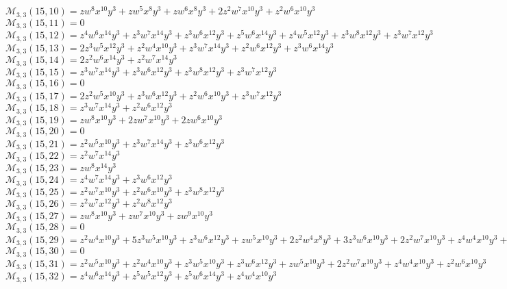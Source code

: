 \documentclass[12pt]{memoireuqam1.3}
\begin{document}
$\mathcal{M}_{3,3}(15,10)=zw^8x^{10}y^3+zw^5x^8y^3+zw^6x^8y^3+2z^2w^7x^{10}y^3+z^2w^6x^{10}y^3$\\
$\mathcal{M}_{3,3}(15,11)=0$\\
$\mathcal{M}_{3,3}(15,12)=z^4w^6x^{14}y^3+z^3w^7x^{14}y^3+z^3w^6x^{12}y^3+z^5w^6x^{14}y^3+z^4w^5x^{12}y^3+z^3w^8x^{12}y^3+z^3w^7x^{12}y^3$\\
$\mathcal{M}_{3,3}(15,13)=2z^3w^5x^{12}y^3+z^2w^4x^{10}y^3+z^3w^7x^{14}y^3+z^2w^6x^{12}y^3+z^3w^6x^{14}y^3$\\
$\mathcal{M}_{3,3}(15,14)=2z^2w^6x^{14}y^3+z^2w^7x^{14}y^3$\\
$\mathcal{M}_{3,3}(15,15)=z^3w^7x^{14}y^3+z^3w^6x^{12}y^3+z^3w^8x^{12}y^3+z^3w^7x^{12}y^3$\\
$\mathcal{M}_{3,3}(15,16)=0$\\
$\mathcal{M}_{3,3}(15,17)=2z^2w^5x^{10}y^3+z^3w^6x^{12}y^3+z^2w^6x^{10}y^3+z^3w^7x^{12}y^3$\\
$\mathcal{M}_{3,3}(15,18)=z^3w^7x^{14}y^3+z^2w^6x^{12}y^3$\\
$\mathcal{M}_{3,3}(15,19)=zw^8x^{10}y^3+2zw^7x^{10}y^3+2zw^6x^{10}y^3$\\
$\mathcal{M}_{3,3}(15,20)=0$\\
$\mathcal{M}_{3,3}(15,21)=z^2w^5x^{10}y^3+z^3w^7x^{14}y^3+z^3w^6x^{12}y^3$\\
$\mathcal{M}_{3,3}(15,22)=z^2w^7x^{14}y^3$\\
$\mathcal{M}_{3,3}(15,23)=zw^8x^{14}y^3$\\
$\mathcal{M}_{3,3}(15,24)=z^4w^7x^{14}y^3+z^3w^6x^{12}y^3$\\
$\mathcal{M}_{3,3}(15,25)=z^2w^7x^{10}y^3+z^2w^6x^{10}y^3+z^3w^8x^{12}y^3$\\
$\mathcal{M}_{3,3}(15,26)=z^2w^7x^{12}y^3+z^2w^8x^{12}y^3$\\
$\mathcal{M}_{3,3}(15,27)=zw^8x^{10}y^3+zw^7x^{10}y^3+zw^9x^{10}y^3$\\
$\mathcal{M}_{3,3}(15,28)=0$\\
$\mathcal{M}_{3,3}(15,29)=z^2w^4x^{10}y^3+5z^3w^5x^{10}y^3+z^3w^6x^{12}y^3+zw^5x^{10}y^3+2z^2w^4x^8y^3+3z^3w^6x^{10}y^3+2z^2w^7x^{10}y^3+z^4w^4x^{10}y^3+z^2w^5x^8y^3$\\
$\mathcal{M}_{3,3}(15,30)=0$\\
$\mathcal{M}_{3,3}(15,31)=z^2w^5x^{10}y^3+z^2w^4x^{10}y^3+z^3w^5x^{10}y^3+z^3w^6x^{12}y^3+zw^5x^{10}y^3+2z^2w^7x^{10}y^3+z^4w^4x^{10}y^3+z^2w^6x^{10}y^3$\\
$\mathcal{M}_{3,3}(15,32)=z^4w^6x^{14}y^3+z^5w^5x^{12}y^3+z^5w^6x^{14}y^3+z^4w^4x^{10}y^3$\\
\end{document}
